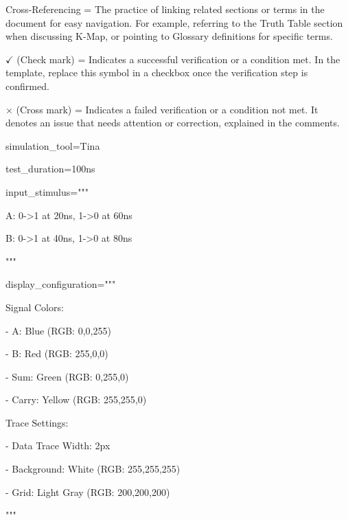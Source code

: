 \documentclass[11pt]{article}
\begin{document}
\noindent Cross-Referencing = The practice of linking related sections or terms in the document for easy navigation. For example, referring to the Truth Table section when discussing K-Map, or pointing to Glossary definitions for specific terms.

\noindent $\checkmark$ (Check mark) = Indicates a successful verification or a condition met. In the template, replace this symbol in a checkbox once the verification step is confirmed.

\noindent $\times$ (Cross mark) = Indicates a failed verification or a condition not met. It denotes an issue that needs attention or correction, explained in the comments.

\vspace{0.5em}


\noindent simulation\_tool=Tina

\noindent test\_duration=100ns

\noindent input\_stimulus="""

\noindent A: 0->1 at 20ns, 1->0 at 60ns

\noindent B: 0->1 at 40ns, 1->0 at 80ns

\noindent """

\vspace{0.5em}


\noindent display\_configuration="""

\noindent Signal Colors:

\noindent - A: Blue (RGB: 0,0,255)

\noindent - B: Red (RGB: 255,0,0)

\noindent - Sum: Green (RGB: 0,255,0)

\noindent - Carry: Yellow (RGB: 255,255,0)

\vspace{0.5em}

\noindent Trace Settings:

\noindent - Data Trace Width: 2px

\noindent - Background: White (RGB: 255,255,255)

\noindent - Grid: Light Gray (RGB: 200,200,200)

\noindent """

\vspace{0.5em}

\end{document}
